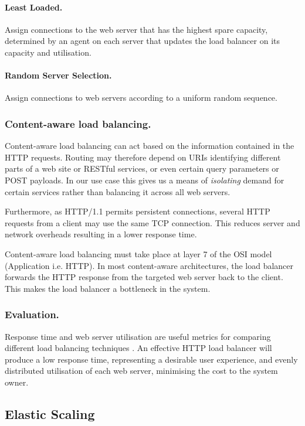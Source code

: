 \paragraph{Least Loaded.} Assign connections to the web server that has the highest spare capacity, determined by an agent on each server that updates the load balancer on its capacity and utilisation.

\paragraph{Random Server Selection.}  Assign connections to web servers according to a uniform random sequence.

\subsubsection{Content-aware load balancing.} Content-aware load balancing can act based on the information contained in the HTTP requests.  Routing may therefore depend on URIs identifying different parts of a web site or RESTful services, or even certain query parameters or POST payloads.  In our use case this gives us a means of {\itshape isolating} demand for certain services rather than balancing it across all web servers.

Furthermore, as HTTP/1.1 permits persistent connections, several HTTP requests from a client may use the same TCP connection.  This reduces server and network overheads resulting in a lower response time.

Content-aware load balancing must take place at layer 7 of the OSI model (Application i.e. HTTP).  In most content-aware architectures, the load balancer forwards the HTTP response from the targeted web server back to the client.  This makes the load balancer a bottleneck in the system.

\subsubsection{Evaluation.}
Response time and web server utilisation are useful metrics for comparing different load balancing techniques \cite{bryhni2000comparison}.  An effective HTTP load balancer will produce a low response time, representing a desirable user experience, and evenly distributed utilisation of each web server, minimising the cost to the system owner.

\subsection{Elastic Scaling}

